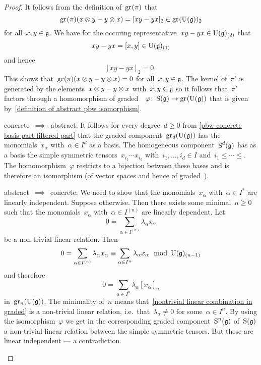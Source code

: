 \begin{proof}
  It follows from the definition of~$\gr(\pi)$ that
  \[
    \gr(\pi)(x \tensor y - y \tensor x)
    =
    [xy - yx]_2
    \in
    \gr(\Univ(\glie))_2
  \]
  for all~$x, y \in \mathfrak{g}$.
  We have for the occuring representative~$xy - yx \in \operatorname{U}(\mathfrak{g})_{(2)}$ that
  \[
    xy - yx
    =
    [x,y]
    \in
    \operatorname{U}(\mathfrak{g})_{(1)}
  \]
  and hence
  \[
    [xy - yx]_2
    =
    0 \,.
  \]
  This shows that~$\gr(\pi)(x \tensor y - y \tensor x) = 0$ for all~$x, y \in \mathfrak{g}$.
  The kernel of~$\pi'$ is generated by the elements~$x \otimes y - y \otimes x$ with~$x,y \in \mathfrak{g}$ so it follows that~$\pi'$ factors through a homomorphism of graded~\algebras{$\kf$}~$\varphi \colon \Symm(\glie) \to \gr(\Univ(\glie))$ that is given by~\eqref{definition of abstract pbw isomorphism}.
  
  \begin{implicationlist}
    \item[concrete~$\implies$~abstract:]
      It follows for every degree~$d \geq 0$ from \cref{pbw concrete basis part filtered part} that the graded component~$\gr[d](\Univ(\glie))$ has the monomials~$x_\alpha$ with~$\alpha \in I^d$ as a basis.
      The homogeneous component~$\operatorname{S}^d(\mathfrak{g})$ has as a basis the simple symmetric tensors~$x_{i_1} \dotsm x_{i_d}$ with~$i_1, \dotsc, i_d \in I$ and~$i_1 \leq \dotsb \leq$.
      The homomorphism~$\varphi$ restricts to a bijection between these bases and is therefore an isomorphism (of vector spaces and hence of graded~{\algebras{$\kf$}}).
    \item[abstract~$\implies$~concrete:]
      We need to show that the monomials~$x_\alpha$ with~$\alpha \in I^*$ are linearly independent.
      Suppose otherwise.
      Then there exists some minimal~$n \geq 0$ such that the monomials~$x_\alpha$ with~$\alpha \in I^{(n)}$ are linearly dependent.
      Let
      \[
        0
        =
        \sum_{\alpha \in I^{(n)}}
        \lambda_\alpha x_\alpha
      \]
      be a non-trivial linear relation.
      Then
      \[
        0
        =
        \sum_{\alpha \in I^{(n)}}
        \lambda_\alpha x_\alpha
        \equiv
        \sum_{\alpha \in I^n}
        \lambda_\alpha x_\alpha
        \mod
        {\operatorname{U}}(\mathfrak{g})_{(n-1)}
      \]
      and therefore
      \begin{equation}
        \label{nontrivial linear combination in graded}
        0
        =
        \sum_{\alpha \in I^n}
        \lambda_\alpha [x_\alpha]_n
      \end{equation}
      in~$\gr[n](\Univ(\glie))$.
      The minimality of~$n$ means that~\eqref{nontrivial linear combination in graded} is a non-trivial linear relation, i.e.\ that~$\lambda_\alpha \neq 0$ for some~$\alpha \in I^n$.
      By using the isomorphism~$\varphi$ we get in the corresponding graded component~$\operatorname{S}^n(\mathfrak{g})$ of~$\operatorname{S}(\mathfrak{g})$ a non-trivial linear relation between the simple symmetric tensors.
      But these are linear independent --- a contradiction.
    \qedhere
  \end{implicationlist}
\end{proof}


